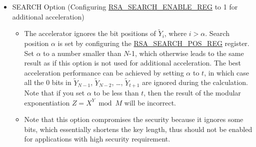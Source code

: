 \documentclass[main\_\_EN.tex]{subfiles}
\begin{document}
\begin{itemize}
 \item SEARCH Option (Configuring \hyperref[regdesc:RSASEARCHENABLEREG]{RSA\_SEARCH\_ENABLE\_REG} to 1 for additional acceleration)
    \begin{itemize}
        \item The accelerator ignores the bit positions of \begin{math} \widetilde{Y}_{i} \end{math}, where \begin{math} i > \alpha \end{math}. Search position \begin{math} \alpha \end{math} is set by configuring the \hyperref[regdesc:RSASEARCHPOSREG]{RSA\_SEARCH\_POS\_REG} register. Set \begin{math} \alpha \end{math} to a number smaller than \begin{math}N\end{math}-1, which otherwise leads to the same result as if this option is not used for additional acceleration. The best acceleration performance can be achieved by setting \begin{math} \alpha \end{math} to \begin{math} t \end{math}, in which case all the 0 bits in \begin{math}\widetilde{Y}_{N-1}\end{math}, \begin{math}\widetilde{Y}_{N-2}\end{math}, \dots, \begin{math}\widetilde{Y}_{t+1}\end{math} are ignored during the calculation. Note that if you set \begin{math} \alpha \end{math} to be less than \begin{math} t \end{math}, then the result of the modular exponentiation \begin{math}Z = X^{Y} \bmod M \end{math} will be incorrect.
    \item Note that this option compromises the security because it ignores some bits, which essentially shortens the key length, thus should not be enabled for applications with high security requirement.
    \end{itemize}


\end{itemize}
\end{document}
